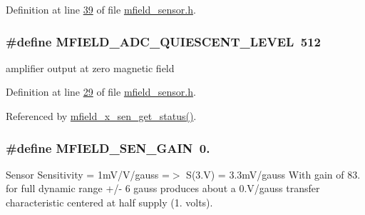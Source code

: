 Definition at line \hyperlink{a00019_source_l00039}{39} of file \hyperlink{a00019_source}{mfield\+\_\+sensor.\+h}.

\hypertarget{a00019_a2310c2bd339d54b86e9fae262def2008}{
\subsubsection[{M\+F\+I\+E\+L\+D\+\_\+\+A\+D\+C\+\_\+\+Q\+U\+I\+E\+S\+C\+E\+N\+T\+\_\+\+L\+E\+V\+E\+L}]{\setlength{\rightskip}{0pt plus 5cm}\#define M\+F\+I\+E\+L\+D\+\_\+\+A\+D\+C\+\_\+\+Q\+U\+I\+E\+S\+C\+E\+N\+T\+\_\+\+L\+E\+V\+E\+L~512}}\label{a00019_a2310c2bd339d54b86e9fae262def2008}


amplifier output at zero magnetic field 



Definition at line \hyperlink{a00019_source_l00029}{29} of file \hyperlink{a00019_source}{mfield\+\_\+sensor.\+h}.



Referenced by \hyperlink{a00050_source_l00276}{mfield\+\_\+x\+\_\+sen\+\_\+get\+\_\+status()}.

\hypertarget{a00019_a0dbceb8ab2804359733a52568f2fd349}{
\subsubsection[{M\+F\+I\+E\+L\+D\+\_\+\+S\+E\+N\+\_\+\+G\+A\+I\+N}]{\setlength{\rightskip}{0pt plus 5cm}\#define M\+F\+I\+E\+L\+D\+\_\+\+S\+E\+N\+\_\+\+G\+A\+I\+N~0.}}\label{a00019_a0dbceb8ab2804359733a52568f2fd349}


Sensor Sensitivity = 1m\+V/\+V/gauss =$>$ S(3.\+V) = 3.\+3m\+V/gauss With gain of 83. for full dynamic range +/-\/ 6 gauss produces about a 0.\+V/gauss transfer characteristic centered at half supply (1. volts). 



